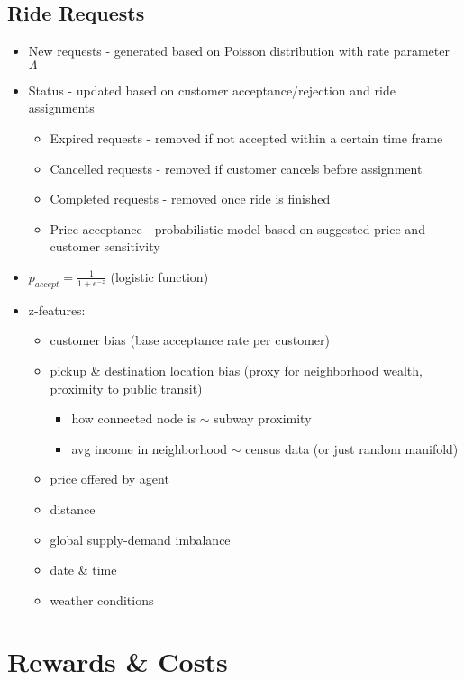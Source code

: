 \documentclass[12pt]{article}
\begin{document}
\subsection*{Ride Requests}
\begin{itemize}
		\item New requests - generated based on Poisson distribution with rate parameter $\Lambda$
		\item Status - updated based on customer acceptance/rejection and ride assignments
				\begin{itemize}
						\item Expired requests - removed if not accepted within a certain time frame
						\item Cancelled requests - removed if customer cancels before assignment
						\item Completed requests - removed once ride is finished
						\item Price acceptance - probabilistic model based on suggested price and customer sensitivity
				\end{itemize}
		\item $p_{accept} = \tfrac{1}{1 + e^{-z}}$ (logistic function)
		\item z-features:
				\begin{itemize}
						\item customer bias (base acceptance rate per customer)
						\item pickup \& destination location bias (proxy for neighborhood wealth, proximity
								to public transit)
								\begin{itemize}
										\item how connected node is $\sim$ subway proximity
										\item avg income in neighborhood $\sim$ census data (or just random manifold)
								\end{itemize}
						\item price offered by agent
						\item distance
						\item global supply-demand imbalance
						\item date \& time
						\item weather conditions
				\end{itemize}
\end{itemize}

\newpage
\section*{Rewards \& Costs}
\end{document}
